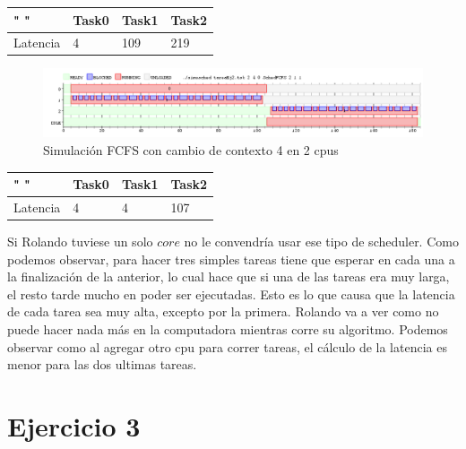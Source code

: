 \documentclass[11pt]{article}
\begin{document}
\begin{table}[htb]
\centering
\begin{tabular}{| l | l | l | l |}
\hline
" " & Task0 & Task1 & Task2 \\
\hline \hline
Latencia & 4 & 109 & 219 \\ \hline
\end{tabular}
\end{table}


  \begin{figure}[H]
    \includegraphics[scale=0.5]{Ejercicio2_2cpu}
    \caption{Simulación FCFS con cambio de contexto 4 en 2 cpus}
  \end{figure}

\begin{table}[htb]
\centering
\begin{tabular}{| l | l | l | l |}
\hline
" " & Task0 & Task1 & Task2 \\
\hline \hline
Latencia & 4 & 4 & 107 \\ \hline
\end{tabular}
\end{table}

Si Rolando tuviese un solo $core$ no le convendría usar ese tipo de scheduler. Como podemos observar, para hacer tres simples tareas
tiene que esperar en cada una a la finalización de la anterior, lo cual hace que si una de las tareas era muy larga, el resto tarde mucho en 
poder ser ejecutadas. Esto es lo que causa que la latencia de cada tarea sea muy alta, excepto por la primera.
Rolando va a ver como no puede hacer nada más en la computadora mientras corre su algoritmo.
Podemos observar como al agregar otro cpu para correr tareas, el cálculo de la latencia es menor para las dos ultimas tareas. 

  \newpage

  \section{Ejercicio 3}
\end{document}
